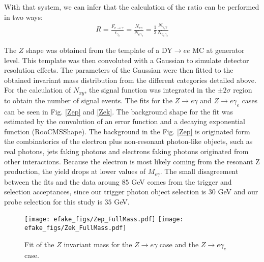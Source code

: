 With that system, we can infer that the calculation of the ratio can be performed in two ways:
\begin{eqnarray}
R  = \frac{F_{e\rightarrow \gamma}}{\epsilon_{\gamma_e}} = \frac{N_{e\gamma}}{N_{e\gamma_e}} = \frac{1}{2} \frac{N_{\gamma_e \gamma}}{N_{\gamma_e \gamma_e }}
\end{eqnarray}

The $Z$ shape was obtained from the template of a DY$\to ee$ MC at generator level. This template was then convoluted with a Gaussian to simulate detector resolution effects. The parameters of the Gaussian were then fitted to the obtained invariant mass distribution from the different categories detailed above. For the calculation of $N_{xy}$, the signal function was  integrated in the $\pm 2\sigma$ region to obtain the number of signal events. The fits for the $Z\rightarrow e \gamma$ and $Z \rightarrow e \gamma_e$ cases can be seen in Fig. \ref{Zep} and \ref{Zek}.
The background shape for the fit was estimated by the convolution of an error function and a decaying exponential function (RooCMSShape). The background in the Fig. \ref{Zep} is originated form the combinatorics of the electron plus non-resonant photon-like objects, such as real photons, jets faking photons and electrons faking photons originated from other interactions. Because the electron is most likely coming from the resonant Z production, the yield drops at lower values of $M_{e\gamma}$. The small disagreement between the fits and the data aroung $85$ GeV comes from the trigger and selection acceptances, since our trigger photon object selection is $30$ GeV and our probe selection \pt for this study is $35$ GeV. 


\begin{figure}[h]
\begin{center}
{\label{Zep}\texttt{[image: efake\_figs/Zep\_FullMass.pdf]}}
{\label{Zek}\texttt{[image: efake\_figs/Zek\_FullMass.pdf]}}
\caption{Fit of the $Z$ invariant mass for the $Z\rightarrow e \gamma$ case and the $Z\rightarrow e \gamma_e$ case.}
\label{Zeall}
\end{center}
\end{figure}

